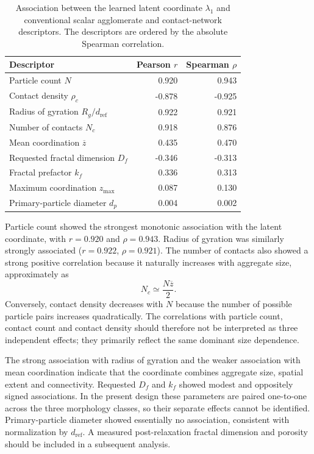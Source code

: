 \documentclass[12pt,a4paper]{article}
\begin{document}
\begin{table}[!tbp]
	\centering
	\caption{Association between the learned latent coordinate $\lambda_1$ and
		conventional scalar agglomerate and contact-network descriptors. The
		descriptors are ordered by the absolute Spearman correlation.}
	\label{tab:latent_correlations}
	\begin{tabular}{lrr}
		\toprule
		\textbf{Descriptor} & \textbf{Pearson $r$} &
		\textbf{Spearman $\rho$} \\
		\midrule
		Particle count $N$                        &  0.920 &  0.943 \\
		Contact density $\rho_c$                  & -0.878 & -0.925 \\
		Radius of gyration $R_g/d_{\mathrm{ref}}$ &  0.922 &  0.921 \\
		Number of contacts $N_c$                  &  0.918 &  0.876 \\
		Mean coordination $\overline z$           &  0.435 &  0.470 \\
		Requested fractal dimension $D_f$         & -0.346 & -0.313 \\
		Fractal prefactor $k_f$                   &  0.336 &  0.313 \\
		Maximum coordination $z_{\max}$           &  0.087 &  0.130 \\
		Primary-particle diameter $d_p$           &  0.004 &  0.002 \\
		\bottomrule
	\end{tabular}
\end{table}

Particle count showed the strongest monotonic association with the latent
coordinate, with $r=0.920$ and $\rho=0.943$. Radius of gyration was similarly
strongly associated ($r=0.922$, $\rho=0.921$). The number of contacts also
showed a strong positive correlation because it naturally increases with aggregate
size, approximately as
\begin{equation}
	N_c \simeq \frac{N\overline z}{2}.
\end{equation}
Conversely, contact density decreases with $N$ because the number of possible
particle pairs increases quadratically. The correlations with particle count,
contact count and contact density should therefore not be interpreted as three
independent effects; they primarily reflect the same dominant size dependence.

The strong association with radius of gyration and the weaker association with
mean coordination indicate that the coordinate combines aggregate size,
spatial extent and connectivity. Requested $D_f$ and $k_f$ showed modest and
oppositely signed associations. In the present design these parameters are
paired one-to-one across the three morphology classes, so their separate
effects cannot be identified. Primary-particle diameter showed essentially no
association, consistent with normalization by $d_{\mathrm{ref}}$. A measured
post-relaxation fractal dimension and porosity should be included in a
subsequent analysis.
\end{document}
